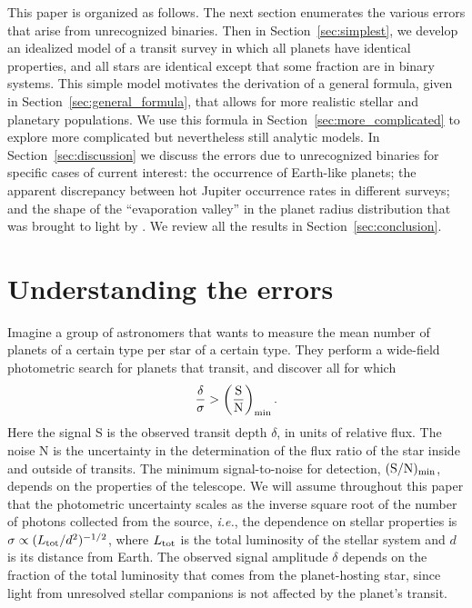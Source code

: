 \documentclass[12pt,modern]{aastex61}
\begin{document}
This paper is organized as follows.  The next section enumerates the
various errors that arise from unrecognized binaries.  Then in
Section~\ref{sec:simplest}, we develop an idealized model of a transit
survey in which all planets have identical properties, and all stars
are identical except that some fraction are in binary systems.  This
simple model motivates the derivation of a general formula, given in
Section~\ref{sec:general_formula}, that allows for more realistic
stellar and planetary populations.  We use this formula in
Section~\ref{sec:more_complicated} to explore more complicated but
nevertheless still analytic models.  In Section~\ref{sec:discussion}
we discuss the errors due to unrecognized binaries for specific cases
of current interest: the occurrence of Earth-like planets; the
apparent discrepancy between hot Jupiter occurrence rates in different
surveys; and the shape of the ``evaporation valley'' in the planet
radius distribution that was brought to light by
\citet{fulton_california-_2017}.  We review all the results in
Section~\ref{sec:conclusion}.


\section{Understanding the errors}
\label{sec:concept}

Imagine a group of astronomers that wants to measure the mean number of
planets of a certain type per star of a certain type.  They perform a
wide-field photometric search for planets that transit, and discover
all for which
\begin{equation}
  \frac{\delta}{\sigma}
  >
  \left(\frac{{\rm S}}{{\rm N}}\right)_{\rm min}.
\label{eq:S_N_thresh}
\end{equation}
Here the signal S is the observed transit depth $\delta$, in units of
relative flux.  The noise N is the uncertainty in the determination of
the flux ratio of the star inside and outside of transits.  The
minimum signal-to-noise for detection, $({\rm S}/{\rm N})_{\rm min}$,
depends on the properties of the telescope.  We will assume throughout
this paper that the photometric uncertainty scales as the inverse
square root of the number of photons collected from the source, {\it
i.e.}, the dependence on stellar properties is $\sigma \propto (L_{\rm
tot}/d^2)^{-1/2}$, where $L_{\rm tot}$ is the total luminosity of the
stellar system and $d$ is its distance from Earth.  The observed
signal amplitude $\delta$ depends on the fraction of the total
luminosity that comes from the planet-hosting star, since light from
unresolved stellar companions is not affected by the planet's transit.
\end{document}
